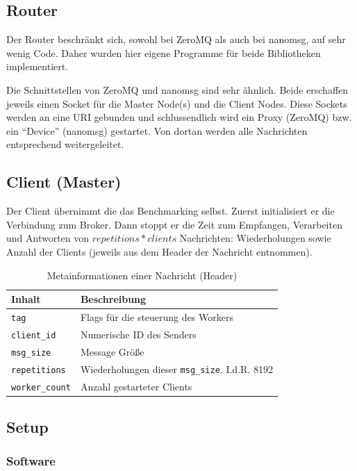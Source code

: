 \documentclass{article}
\begin{document}
\subsection{Router}

Der Router beschränkt sich, sowohl bei ZeroMQ als auch bei nanomsg, auf
sehr wenig Code. Daher wurden hier eigene Programme für beide
Bibliotheken implementiert.

Die Schnittstellen von ZeroMQ und nanomsg sind sehr ähnlich. Beide
erschaffen jeweils einen Socket für die Master Node(s) und die Client
Nodes. Diese Sockets werden an eine URI gebunden und schlussendlich wird
ein Proxy (ZeroMQ) bzw. ein ``Device'' (nanomsg) gestartet. Von dortan
werden alle Nachrichten entsprechend weitergeleitet.

\subsection{Client (Master)}

Der Client übernimmt die das Benchmarking selbst. Zuerst initialisiert
er die Verbindung zum Broker. Dann stoppt er die Zeit zum Empfangen,
Verarbeiten und Antworten von $repetitions * clients$ Nachrichten: Wiederholungen sowie Anzahl der Clients (jeweils aus dem Header der
Nachricht entnommen). 

\begin{table}[h!]
\centering
\begin{tabular}{l | l} 
    Inhalt & Beschreibung \\
    \hline
     \texttt{tag} & Flags für die steuerung des Workers \\
     \texttt{client\_id} & Numerische ID des Senders \\
     \texttt{msg\_size} & Message Größe \\
     \texttt{repetitions} & Wiederholungen dieser 
     \texttt{msg\_size}. I.d.R. 8192 \\
     \texttt{worker\_count} & Anzahl gestarteter Clients \\
 \hline
\end{tabular}
\caption{Metainformationen einer Nachricht (Header)}
\label{table:msg_header}
\end{table}

\subsection{Setup}

\subsubsection{Software}
\end{document}
